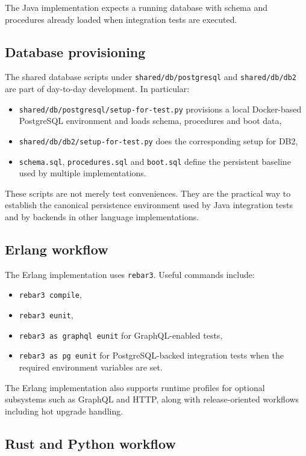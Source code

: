 The Java implementation expects a running database with schema and procedures already loaded when integration tests are executed.

\subsection{Database provisioning}

The shared database scripts under \texttt{shared/db/postgresql} and \texttt{shared/db/db2} are part of day-to-day development. In particular:
\begin{itemize}
\item \texttt{shared/db/postgresql/setup-for-test.py} provisions a local Docker-based PostgreSQL environment and loads schema, procedures and boot data,
\item \texttt{shared/db/db2/setup-for-test.py} does the corresponding setup for DB2,
\item \texttt{schema.sql}, \texttt{procedures.sql} and \texttt{boot.sql} define the persistent baseline used by multiple implementations.
\end{itemize}

These scripts are not merely test conveniences. They are the practical way to establish the canonical persistence environment used by Java integration tests and by backends in other language implementations.

\subsection{Erlang workflow}

The Erlang implementation uses \texttt{rebar3}. Useful commands include:
\begin{itemize}
\item \texttt{rebar3 compile},
\item \texttt{rebar3 eunit},
\item \texttt{rebar3 as graphql eunit} for GraphQL-enabled tests,
\item \texttt{rebar3 as pg eunit} for PostgreSQL-backed integration tests when the required environment variables are set.
\end{itemize}

The Erlang implementation also supports runtime profiles for optional subsystems such as GraphQL and HTTP, along with release-oriented workflows including hot upgrade handling.

\subsection{Rust and Python workflow}

